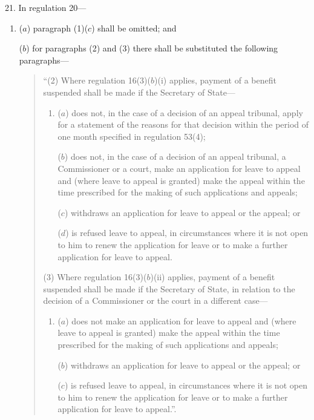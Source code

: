 \documentclass[12pt,a4paper]{article}
\begin{document}
\medskip

21.  In regulation 20—
\begin{enumerate}\item[]
($a$) paragraph (1)($c$)  shall be omitted; and

($b$) for paragraphs (2) and (3) there shall be substituted the following paragraphs—
\begin{quotation}
“(2) Where regulation 16(3)($b$)(i)  applies, payment of a benefit suspended shall be made if the Secretary of State—
\begin{enumerate}\item[]
($a$) does not, in the case of a decision of an appeal tribunal, apply for a statement of the reasons for that decision within the period of one month specified in regulation 53(4);

($b$) does not, in the case of a decision of an appeal tribunal, a Commissioner or a court, make an application for leave to appeal and (where leave to appeal is granted) make the appeal within the time prescribed for the making of such applications and appeals;

($c$) withdraws an application for leave to appeal or the appeal; or

($d$) is refused leave to appeal, in circumstances where it is not open to him to renew the application for leave or to make a further application for leave to appeal.
\end{enumerate}

(3) Where regulation 16(3)($b$)(ii)  applies, payment of a benefit suspended shall be made if the Secretary of State, in relation to the decision of a Commissioner or the court in a different case—
\begin{enumerate}\item[]
($a$) does not make an application for leave to appeal and (where leave to appeal is granted) make the appeal within the time prescribed for the making of such applications and appeals;

($b$) withdraws an application for leave to appeal or the appeal; or

($c$) is refused leave to appeal, in circumstances where it is not open to him to renew the application for leave or to make a further application for leave to appeal.”.
\end{enumerate}
\end{quotation}
\end{enumerate}

\medskip
\end{document}

